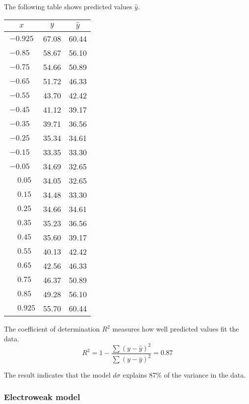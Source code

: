 The following table shows predicted values $\hat{y}$.

\begin{center}
\begin{tabular}{|c|c|c|}
\hline
$x$ & $y$ & $\hat{y}$ \\
\hline
$-0.925$ & 67.08 & 60.44\\
$-0.85\phantom{0}$ & 58.67 & 56.10\\
$-0.75\phantom{0}$ & 54.66 & 50.89\\
$-0.65\phantom{0}$ & 51.72 & 46.33\\
$-0.55\phantom{0}$ & 43.70 & 42.42\\
$-0.45\phantom{0}$ & 41.12 & 39.17\\
$-0.35\phantom{0}$ & 39.71 & 36.56\\
$-0.25\phantom{0}$ & 35.34 & 34.61\\
$-0.15\phantom{0}$ & 33.35 & 33.30\\
$-0.05\phantom{0}$ & 34.69 & 32.65\\
$\phantom{+}0.05\phantom{0}$ & 34.05 & 32.65\\
$\phantom{+}0.15\phantom{0}$ & 34.48 & 33.30\\
$\phantom{+}0.25\phantom{0}$ & 34.66 & 34.61\\
$\phantom{+}0.35\phantom{0}$ & 35.23 & 36.56\\
$\phantom{+}0.45\phantom{0}$ & 35.60 & 39.17\\
$\phantom{+}0.55\phantom{0}$ & 40.13 & 42.42\\
$\phantom{+}0.65\phantom{0}$ & 42.56 & 46.33\\
$\phantom{+}0.75\phantom{0}$ & 46.37 & 50.89\\
$\phantom{+}0.85\phantom{0}$ & 49.28 & 56.10\\
$\phantom{+}0.925$ & 55.70 & 60.44\\
\hline
\end{tabular}
\end{center}

The coefficient of determination $R^2$ measures how well predicted values fit the data.
\begin{equation*}
R^2=1-\frac{\sum(y-\hat{y})^2}{\sum(y-\bar{y})^2}=0.87
\end{equation*}

The result indicates that the model $d\sigma$ explains 87\% of the variance in the data.

\subsubsection*{Electroweak model}

